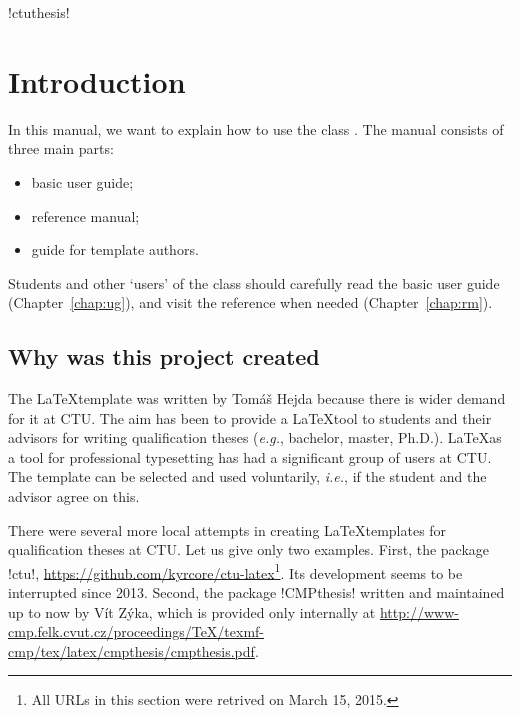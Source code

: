 \documentclass[twoside,11pt]{ctuthesis}
\theoremstyle{plain}
\theoremstyle{definition}
\theoremstyle{note}
\begin{document}
\newcommand\ctuclsname{\leavevmode\unhcopy\ctuclsnamebox}
\newsavebox\ctuclsnamebox
\begin{lrbox}{\ctuclsnamebox}
\ctulst!ctuthesis!
\end{lrbox}

\maketitle

\chapter{Introduction}






In this manual, we want to explain how to use the class \ctuclsname.
The manual consists of three main parts:

\begin{itemize}
\item basic user guide;
\item reference manual;
\item guide for template authors.
\end{itemize}

Students and other `users' of the class should carefully read the basic user guide (Chapter~\ref{chap:ug}),
 and visit the reference when needed (Chapter~\ref{chap:rm}).




\section*{Why was this project created}

The \ctuclsname\@ \LaTeX\@ template was written by Tomáš Hejda because there is wider demand for it at CTU. The aim has been to provide a \LaTeX\@ tool to students and their advisors for writing qualification theses (\emph{e.g.}, bachelor, master, Ph.D.). \LaTeX\@ as a tool for professional typesetting has had a significant group of users at CTU. The \ctuclsname\@ template can be selected and used voluntarily, \emph{i.e.}, if the student and the advisor agree on this.

There were several more local attempts in creating \LaTeX\@ templates for qualification theses at CTU. Let us give only two examples. First, the package \ctulst!ctu!, \url{https://github.com/kyrcore/ctu-latex}\footnote{All URLs in this section were retrived on March 15, 2015.}. Its development seems to be interrupted since 2013. Second, the package \ctulst!CMPthesis! written and maintained up to now by Vít Zýka, which is provided only internally at \url{http://www-cmp.felk.cvut.cz/proceedings/TeX/texmf-cmp/tex/latex/cmpthesis/cmpthesis.pdf}.
\end{document}
